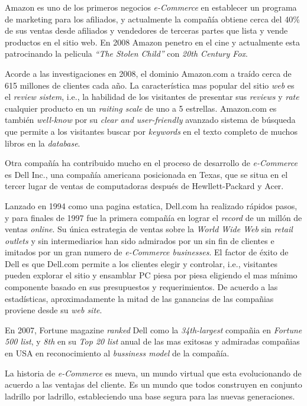 Amazon es uno de los primeros negocios \textit{e-Commerce} en establecer un programa de marketing para los afiliados, y actualmente la compañía obtiene cerca del 40\% de sus ventas desde afiliados y vendedores de terceras partes que lista y vende productos en el sitio web. En 2008 Amazon penetro en el cine y actualmente esta patrocinando la pelicula \textit{“The Stolen Child”} con \textit{20th Century Fox}.

Acorde a las investigaciones en 2008, el dominio Amazon.com a traído cerca de 615 millones de clientes cada año. La característica mas popular del sitio \textit{web} es el \textit{review sistem}, i.e., la habilidad de los visitantes de presentar sus \textit{reviews} y \textit{rate} cualquier producto en un \textit{raiting scale} de uno a 5 estrellas. Amazon.com es también \textit{well-know} por su \textit{clear and user-friendly} avanzado sistema de búsqueda que permite a los visitantes buscar por \textit{keywords} en el texto completo de muchos libros en la \textit{database}.

Otra compañía ha contribuido mucho en el proceso de desarrollo de \textit{e-Commerce} es Dell Inc., una compañía americana posicionada en Texas, que se situa en el tercer lugar de ventas de computadoras después de Hewllett-Packard y Acer.

Lanzado en 1994 como una pagina estatica, Dell.com ha realizado rápidos pasos, y para finales de 1997 fue la primera compañía en lograr el \textit{record} de un millón de ventas \textit{online}. Su única estrategia de ventas sobre la \textit{World Wide Web} sin \textit{retail outlets} y sin intermediarios han sido admirados por un sin fin de clientes e imitados por un gran numero de \textit{e-Commerce businesses}. El factor de éxito de Dell es que Dell.com permite a los clientes elegir y controlar, i.e., visitantes pueden explorar el sitio y ensamblar PC piesa por piesa eligiendo el mas mínimo componente basado en sus presupuestos y requerimientos. De acuerdo a las estadísticas, aproximadamente la mitad de las ganancias de las compañias proviene desde su \textit{web site}.

En 2007, Fortune magazine \textit{ranked} Dell como la \textit{34th-largest} compañia en \textit{Fortune 500 list}, y \textit{8th} en su \textit{Top 20 list} anual de las mas exitosas y admiradas compañias en USA en reconocimiento al \textit{bussiness model} de la compañía.

La historia de \textit{e-Commerce} es nueva, un mundo virtual que esta evolucionando de acuerdo a las ventajas del cliente. Es un mundo que todos construyen en conjunto ladrillo por ladrillo, estableciendo una base segura para las nuevas generaciones.

